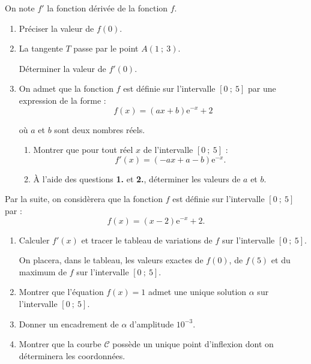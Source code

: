 \par
On note $f'$ la fonction dérivée de la fonction $f$.
\par
%
%
\par
\begin{enumerate}
     \item
     Préciser la valeur de $f(0)$.
     \item
     La tangente $T$ passe par le point $A(1~;~3)$.
     \par
     Déterminer la valeur de $f'(0)$.
     \item
     On admet que la fonction $f$ est définie sur l'intervalle $[0~;~5]$ par une expression de la forme :
     \[ f(x)=(ax+b)\text{e}^{-x}+2 \]
     \par
     où $a$ et $b$ sont deux nombres réels.
     \par
     \begin{enumerate}
          \item
          Montrer que pour tout réel $x$ de l'intervalle $[0~;~5]$ :
          \[ f'(x)=(-ax+a-b)\text{e}^{-x}. \]
          \item
          \`A l'aide des questions \textbf{1.} et \textbf{2.}, déterminer les valeurs de $a$ et $b$.
          \par
     \end{enumerate}
     \par
\end{enumerate}
\par
%
%
\par
Par la suite, on considèrera que la fonction $f$ est définie sur l'intervalle $[0~;~5]$ par :
\[ f(x)=(x-2)\text{e}^{-x}+2. \]
\par
\begin{enumerate}
     \item
     Calculer $f'(x)$ et tracer le tableau de variations de $f$ sur l'intervalle $[0~;~5]$.
     \par
     On placera, dans le tableau, les valeurs exactes de $f(0)$, de $f(5)$ et du maximum de $f$ sur l'intervalle $[0~;~5]$.
     \item
     Montrer que l'équation $f(x)=1$ admet une unique solution $\alpha$ sur l'intervalle $[0~;~5]$.
     \item
     Donner un encadrement de $\alpha$ d'amplitude $10^{-3}$.
     \item
     Montrer que la courbe $\mathscr{C}$ possède un unique point d'inflexion dont on déterminera les coordonnées.
     \par
\end{enumerate}
